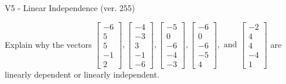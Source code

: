 \begin{exercise}
  \begin{exerciseTitle}V5 - Linear Independence (ver. 255)\end{exerciseTitle}
  \begin{exerciseStatement}
    Explain why the vectors \(\left[\begin{array}{r}
-6 \\
5 \\
5 \\
-1 \\
2
\end{array}\right] , \left[\begin{array}{r}
-4 \\
-3 \\
3 \\
-1 \\
-6
\end{array}\right] , \left[\begin{array}{r}
-5 \\
0 \\
-6 \\
-4 \\
-3
\end{array}\right] , \left[\begin{array}{r}
-6 \\
0 \\
-6 \\
-5 \\
4
\end{array}\right] , \text{ and } \left[\begin{array}{r}
-2 \\
4 \\
4 \\
-4 \\
1
\end{array}\right]\) are linearly dependent or linearly independent.	



\end{exerciseStatement}
\end{exercise}
